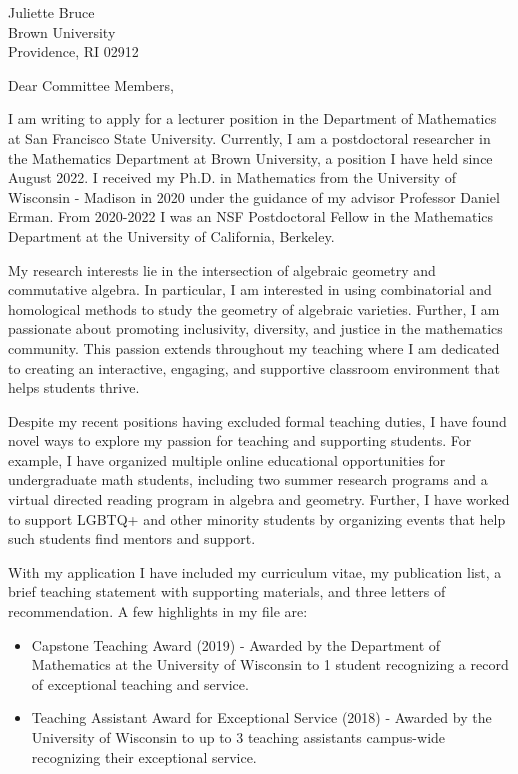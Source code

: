 \documentclass[11pt]{brownletter}
\date{April 5, 2024} %
\begin{document}
\begin{letter}{Juliette Bruce\\ 
               Brown University\\ 
               Providence, RI 02912}

\opening{Dear Committee Members,}

I am writing to apply for a lecturer position in the Department of Mathematics at San Francisco State University. Currently, I am a postdoctoral researcher in the Mathematics Department at Brown University, a position I have held since August 2022. I received my Ph.D. in Mathematics from the University of Wisconsin - Madison in 2020 under the guidance of my advisor Professor Daniel Erman. From 2020-2022 I was an NSF Postdoctoral Fellow in the Mathematics Department at the University of California, Berkeley.



My research interests lie in the intersection of algebraic geometry and commutative algebra. In particular, I am interested in using combinatorial and homological methods to study the geometry of algebraic varieties. Further, I am passionate about promoting inclusivity, diversity, and justice in the mathematics community. This passion extends throughout my teaching where I am dedicated to creating an interactive, engaging, and supportive classroom environment that helps students thrive. 

Despite my recent positions having excluded formal teaching duties, I have found novel ways to explore my passion for teaching and supporting students. For example, I have organized multiple online educational opportunities for undergraduate math students, including two summer research programs and a virtual directed reading program in algebra and geometry. Further, I have worked to support LGBTQ+ and other minority students by organizing events that help such students find mentors and support.  

With my application I have included my curriculum vitae, my publication list, a brief teaching statement with supporting materials, and three letters of recommendation. A few highlights in my file are:
\begin{itemize}

\item Capstone Teaching Award (2019) - Awarded by the Department of Mathematics at the University of Wisconsin to 1 student recognizing a record of exceptional teaching and service.
\item Teaching Assistant Award for Exceptional Service  (2018) - Awarded by the University of Wisconsin to up to 3 teaching assistants campus-wide recognizing their exceptional service.


\end{itemize}
\end{letter}
\end{document}
